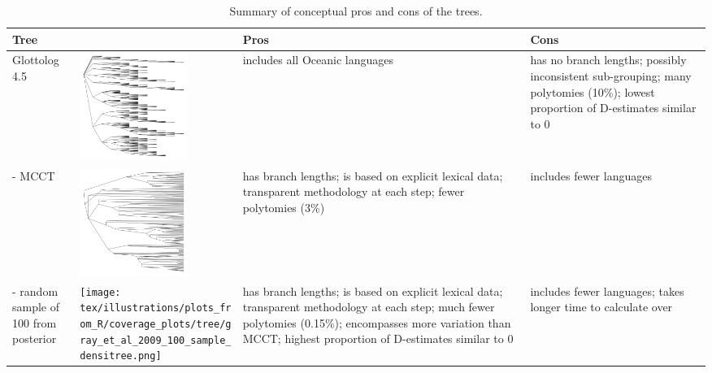 \documentclass[12pt,letterpaper]{article}
\begin{document}
\begin{table}[ht]
\centering
\caption{Summary of conceptual pros and cons of the trees.}
\label{trees_pros_cons}
\begin{tabular}{m{3cm}m{3.5cm}m{3.8cm}m{3.8cm}}
  \toprule
\textbf{Tree} & &\textbf{Pros} & \textbf{Cons} \\ \midrule
Glottolog 4.5 & \includegraphics[width=3.5cm]{illustrations/plots_from_R/coverage_plots/tree/Oceanic_glottolog_tree_bare.png} &includes all Oceanic languages & has no branch lengths; possibly inconsistent sub-grouping; many polytomies (10\%); lowest proportion of D-estimates similar to 0 \\
\midrule
\citet{grayetal_2009} - MCCT & \includegraphics[width=3.5cm]{illustrations/plots_from_R/coverage_plots/tree/Oceanic_gray_et_al_tree_mcct_bare.png} &has branch lengths; is based on explicit lexical data; transparent methodology at each step; fewer polytomies (3\%) & includes fewer languages \\
\midrule
\citet{grayetal_2009} - random sample of 100 from posterior &  \texttt{[image: tex/illustrations/plots\_from\_R/coverage\_plots/tree/gray\_et\_al\_2009\_100\_sample\_densitree.png]}& has branch lengths; is based on explicit lexical data; transparent methodology at each step; much fewer polytomies (0.15\%); encompasses more variation than MCCT; highest proportion of D-estimates similar to 0 & includes fewer languages; takes longer time to calculate over\\
\bottomrule
\end{tabular}
\end{table}

\FloatBarrier
\end{document}
